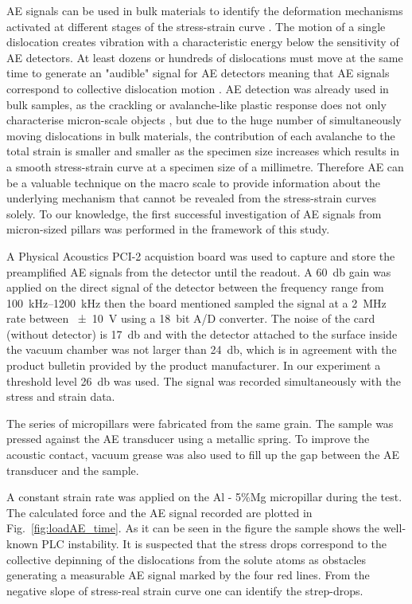 AE signals can be used in bulk materials to identify the deformation mechanisms activated at different stages of the stress-strain curve \cite{BOHLEN2004214,PhysRevB.76.224110,dobrovn2009acoustic,KOVACS2014113}. The motion of a single dislocation creates vibration with a characteristic energy below the sensitivity of AE detectors. At least dozens or hundreds of dislocations must move at the same time to generate an "audible" signal for AE detectors meaning that AE signals correspond to collective dislocation motion \cite{doi:10.1179/msc.1981.15.11-12.599}. AE detection was already used in bulk samples, as the crackling or avalanche-like plastic response does not only characterise micron-scale objects \cite{PhysRevB.76.224110}, but due to the huge number of simultaneously moving dislocations in bulk materials, the contribution of each avalanche to the total strain is smaller and smaller as the specimen size increases which results in a smooth stress-strain curve at a specimen size of a millimetre. Therefore AE can be a valuable technique on the macro scale to provide information about the underlying mechanism that cannot be revealed from the stress-strain curves solely. To our knowledge, the first successful investigation of AE signals from micron-sized pillars was performed in the framework of this study.

A Physical Acoustics PCI-2 acquistion board was used to capture and store the preamplified AE signals from the detector until the readout. A \SI{60}{\decibel} gain was applied on the direct signal of the detector between the frequency range from \SIrange{100}{1200}{kHz} then the board mentioned sampled the signal at a \SI{2}{MHz} rate between \SI{\pm 10}{V} using a \SI{18}{bit} A/D converter. The noise of the card (without detector) is \SI{17}{\decibel} and with the detector attached to the surface inside the vacuum chamber was not larger than \SI{24}{\decibel}, which is in agreement with the product bulletin provided by the product manufacturer. In our experiment a threshold level \SI{26}{\decibel} was used. The signal was recorded simultaneously with the stress and strain data.

The series of micropillars were fabricated from the same grain. The sample was pressed against the AE transducer using a metallic spring. To improve the acoustic contact, vacuum grease was also used to fill up the gap between the AE transducer and the sample.

A constant strain rate was applied on the Al - 5\%Mg micropillar during the test. The calculated force and the AE signal recorded are plotted in Fig.~\ref{fig:loadAE_time}. As it can be seen in the figure the sample shows the well-known PLC instability. It is suspected that the stress drops correspond to the collective depinning of the dislocations from the solute atoms as obstacles generating a measurable AE signal marked by the four red lines. From  the negative slope of stress-real strain curve one can identify the strep-drops.

